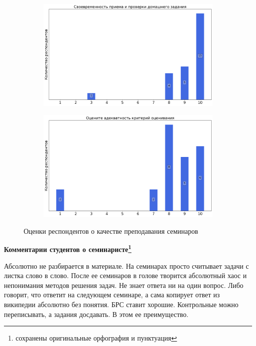 \begin{figure}[H]
\begin{subfigure}[b]{0.45\textwidth}
            \end{subfigure}
            \begin{subfigure}[b]{0.45\textwidth}
                \centering
                \includegraphics[width=\textwidth]{images/1 course/Аналитическая геометрия/seminarists-marks-Петрович А.А.-2.png}
            \end{subfigure}
            \begin{subfigure}[b]{0.45\textwidth}
                \centering
                \includegraphics[width=\textwidth]{images/1 course/Аналитическая геометрия/seminarists-marks-Петрович А.А.-3.png}
            \end{subfigure}	
            \caption{Оценки респондентов о качестве преподавания семинаров}
        \end{figure}

        \textbf{Комментарии студентов о семинаристе\protect\footnote{сохранены оригинальные орфография и пунктуация}}
            \begin{commentbox} 
                Абсолютно не разбирается в материале. На семинарах просто считывает задачи с листка слово в слово. После ее семинаров в голове творится абсолютный хаос и непонимания методов решения задач. Не знает ответа ни на один вопрос. Либо говорит, что ответит на следующем семинаре, а сама копирует ответ из википедии абсолютно без понятия. БРС ставит хорошие. Контрольные можно переписывать, а задания досдавать. В этом ее преимущество. 
            \end{commentbox} 
        
